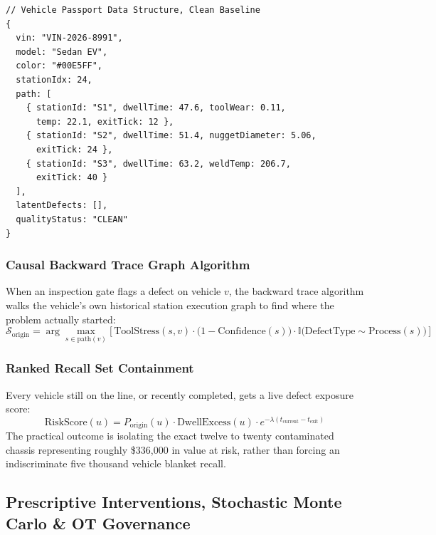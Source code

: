 \documentclass[11pt]{article}
\begin{document}
\begin{tcolorbox}[colback=lightbg,colframe=sylasgray,arc=1mm,fontupper=\ttfamily\small,breakable]
\begin{verbatim}
// Vehicle Passport Data Structure, Clean Baseline
{
  vin: "VIN-2026-8991",
  model: "Sedan EV",
  color: "#00E5FF",
  stationIdx: 24,
  path: [
    { stationId: "S1", dwellTime: 47.6, toolWear: 0.11,
      temp: 22.1, exitTick: 12 },
    { stationId: "S2", dwellTime: 51.4, nuggetDiameter: 5.06,
      exitTick: 24 },
    { stationId: "S3", dwellTime: 63.2, weldTemp: 206.7,
      exitTick: 40 }
  ],
  latentDefects: [],
  qualityStatus: "CLEAN"
}
\end{verbatim}
\end{tcolorbox}

\subsubsection{Causal Backward Trace Graph Algorithm}

When an inspection gate flags a defect on vehicle $v$, the backward trace algorithm walks the vehicle's own historical station execution graph to find where the problem actually started:
\begin{equation}
\mathcal{S}_{\text{origin}} = \arg\max_{s \in \text{path}(v)} \Big[\, \text{ToolStress}(s, v) \cdot \big(1 - \text{Confidence}(s)\big) \cdot \mathbb{I}\big(\text{DefectType} \sim \text{Process}(s)\big) \,\Big]
\end{equation}

\subsubsection{Ranked Recall Set Containment}

Every vehicle still on the line, or recently completed, gets a live defect exposure score:
\begin{equation}
\text{RiskScore}(u) = P_{\text{origin}}(u) \cdot \text{DwellExcess}(u) \cdot e^{-\lambda(t_{\text{current}} - t_{\text{exit}})}
\end{equation}
The practical outcome is isolating the exact twelve to twenty contaminated chassis representing roughly \$336{,}000 in value at risk, rather than forcing an indiscriminate five thousand vehicle blanket recall.

\subsection{Prescriptive Interventions, Stochastic Monte Carlo \& OT Governance}
\end{document}
